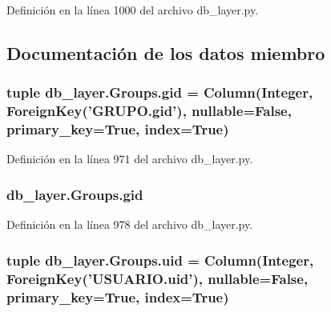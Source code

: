Definición en la línea 1000 del archivo db\-\_\-layer.\-py.



\subsection{Documentación de los datos miembro}
\hypertarget{classdb__layer_1_1_groups_aded07ebac158a99bf9fd01c87bba222c}{
\subsubsection[{gid}]{\setlength{\rightskip}{0pt plus 5cm}tuple db\-\_\-layer.\-Groups.\-gid = Column(Integer, Foreign\-Key('G\-R\-U\-P\-O.\-gid'), nullable=False, primary\-\_\-key=True, index=True)\hspace{0.3cm}{\ttfamily [static]}}}\label{classdb__layer_1_1_groups_aded07ebac158a99bf9fd01c87bba222c}


Definición en la línea 971 del archivo db\-\_\-layer.\-py.

\hypertarget{classdb__layer_1_1_groups_af0a5178fa5eced1a1d3ff053a8171bd6}{
\subsubsection[{gid}]{\setlength{\rightskip}{0pt plus 5cm}db\-\_\-layer.\-Groups.\-gid}}\label{classdb__layer_1_1_groups_af0a5178fa5eced1a1d3ff053a8171bd6}


Definición en la línea 978 del archivo db\-\_\-layer.\-py.

\hypertarget{classdb__layer_1_1_groups_a14ee9c00efa52f89924369f75532c416}{
\subsubsection[{uid}]{\setlength{\rightskip}{0pt plus 5cm}tuple db\-\_\-layer.\-Groups.\-uid = Column(Integer, Foreign\-Key('U\-S\-U\-A\-R\-I\-O.\-uid'), nullable=False, primary\-\_\-key=True, index=True)\hspace{0.3cm}{\ttfamily [static]}}}\label{classdb__layer_1_1_groups_a14ee9c00efa52f89924369f75532c416}


